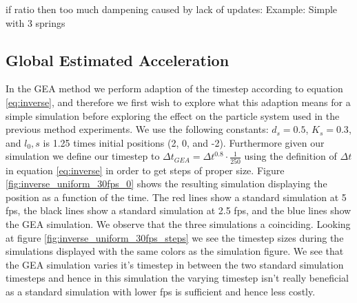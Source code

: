 \documentclass[11pt]{article}
\begin{document}
\begin{figure}
\begin{subfigure}[t]{0.5\textwidth}
        \caption{}
        \label{fig:atomic_uniform_10fps_1}
    \end{subfigure}
    \caption{}
    \label{fig:atomic_uniform}
\end{figure}


if ratio then too much dampening caused by lack of updates: Example: Simple with
3 springs

\subsection{Global Estimated Acceleration}
In the GEA method we perform adaption of the timestep according to equation
\ref{eq:inverse}, and therefore we first wish to explore what this adaption
means for a simple simulation before exploring the effect on the particle
system used in the previous method experiments. We use the following
constants: $d_s = 0.5$, $K_s = 0.3$, and $l_0,s$ is 1.25 times initial
positions (2, 0, and -2). Furthermore given our simulation we define our
timestep to $\Delta t_{GEA} = \Delta t^{0.8}\cdot \frac{1}{250}$ using
the definition of $\Delta t$ in equation \ref{eq:inverse} in order to get
steps of proper size. Figure \ref{fig:inverse_uniform_30fps_0} shows the
resulting simulation displaying the position as a function of the time.
The red lines show a standard simulation at 5 fps, the black lines show a
standard simulation at 2.5 fps, and the blue lines show the GEA simulation.
We observe that the three simulations a coinciding. Looking at figure
\ref{fig:inverse_uniform_30fps_steps} we see the timestep sizes during the
simulations displayed with the same colors as the simulation figure. We see
that the GEA simulation varies it's timestep in between the two standard
simulation timesteps and hence in this simulation the varying timestep isn't
really beneficial as a standard simulation with lower fps is sufficient and
hence less costly.
\end{document}
